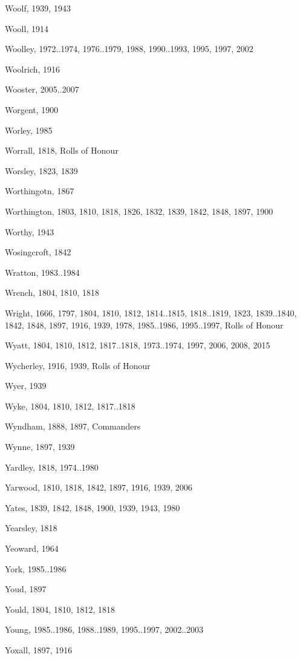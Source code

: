 {\begin{theindex}
\item Woolf, 1939, 1943
\item Wooll, 1914
\item Woolley, 1972..1974, 1976..1979, 1988, 1990..1993, 1995, 1997, 2002
\item Woolrich, 1916
\item Wooster, 2005..2007
\item Worgent, 1900
\item Worley, 1985
\item Worrall, 1818, Rolls of Honour
\item Worsley, 1823, 1839
\item Worthingotn, 1867
\item Worthington, 1803, 1810, 1818, 1826, 1832, 1839, 1842, 1848, 1897, 1900
\item Worthy, 1943
\item Wosingcroft, 1842
\item Wratton, 1983..1984
\item Wrench, 1804, 1810, 1818
\item Wright, 1666, 1797, 1804, 1810, 1812, 1814..1815, 1818..1819, 1823, 1839..1840, 1842, 1848, 1897, 1916, 1939, 1978, 1985..1986, 1995..1997, Rolls of Honour
\item Wyatt, 1804, 1810, 1812, 1817..1818, 1973..1974, 1997, 2006, 2008, 2015
\item Wycherley, 1916, 1939, Rolls of Honour
\item Wyer, 1939
\item Wyke, 1804, 1810, 1812, 1817..1818
\item Wyndham, 1888, 1897, Commanders
\item Wynne, 1897, 1939
\item Yardley, 1818, 1974..1980
\item Yarwood, 1810, 1818, 1842, 1897, 1916, 1939, 2006
\item Yates, 1839, 1842, 1848, 1900, 1939, 1943, 1980
\item Yearsley, 1818
\item Yeoward, 1964
\item York, 1985..1986
\item Youd, 1897
\item Yould, 1804, 1810, 1812, 1818
\item Young, 1985..1986, 1988..1989, 1995..1997, 2002..2003
\item Yoxall, 1897, 1916
\end{theindex}
}
